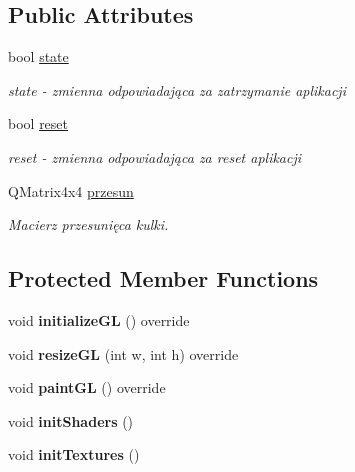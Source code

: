\subsection*{Public Attributes}
\begin{DoxyCompactItemize}
\item 
\mbox{\label{classMainWidget_aad9c9c0b73a768fe201df0cef3c186b7}} 
bool \hyperlink{classMainWidget_aad9c9c0b73a768fe201df0cef3c186b7}{state}
\begin{DoxyCompactList}\small\item\em state -\/ zmienna odpowiadająca za zatrzymanie aplikacji \end{DoxyCompactList}\item 
\mbox{\label{classMainWidget_a8320222b0090e6cd5550825cdab4c8aa}} 
bool \hyperlink{classMainWidget_a8320222b0090e6cd5550825cdab4c8aa}{reset}
\begin{DoxyCompactList}\small\item\em reset -\/ zmienna odpowiadająca za reset aplikacji \end{DoxyCompactList}\item 
\mbox{\label{classMainWidget_a6df60adf8e9c01f15a967932cb746c54}} 
Q\+Matrix4x4 \hyperlink{classMainWidget_a6df60adf8e9c01f15a967932cb746c54}{przesun}
\begin{DoxyCompactList}\small\item\em Macierz przesunięca kulki. \end{DoxyCompactList}\end{DoxyCompactItemize}
\subsection*{Protected Member Functions}
\begin{DoxyCompactItemize}
\item 
\mbox{\label{classMainWidget_a165d742c4d8f6f65458b04ac8b9ea1db}} 
void {\bfseries initialize\+GL} () override
\item 
\mbox{\label{classMainWidget_a2a1c57a221291985658820568a8bd5c0}} 
void {\bfseries resize\+GL} (int w, int h) override
\item 
\mbox{\label{classMainWidget_afbf87f376e972633a553a86c55e37e2e}} 
void {\bfseries paint\+GL} () override
\item 
\mbox{\label{classMainWidget_a3d8d55c802fd4b4dabeef5bd9592c697}} 
void {\bfseries init\+Shaders} ()
\item 
\mbox{\label{classMainWidget_a45e5b0ff42304bfe4d0500bc4cff79d4}} 
void {\bfseries init\+Textures} ()
\end{DoxyCompactItemize}
